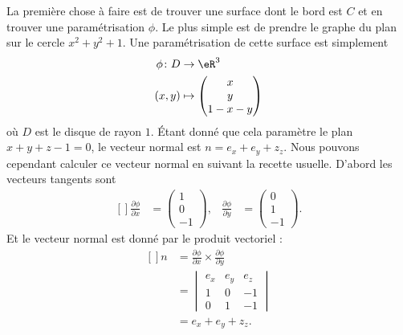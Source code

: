 \begin{example}
    La première chose à faire est de trouver une surface dont le bord est $C$ et en trouver une paramétrisation $\phi$. Le plus simple est de prendre le graphe du plan sur le cercle $x^2+y^2+1$. Une paramétrisation de cette surface est simplement
    \begin{equation}
        \begin{aligned}
            \phi\colon D&\to \eR^3 \\
            (x,y)&\mapsto \begin{pmatrix}
                x    \\ 
                y    \\ 
                1-x-y    
            \end{pmatrix}
        \end{aligned}
    \end{equation}
    où $D$ est le disque de rayon $1$. Étant donné que cela paramètre le plan $x+y+z-1=0$, le vecteur normal est $n=e_x+e_y+z_z$. Nous pouvons cependant calculer ce vecteur normal en suivant la recette usuelle. D'abord les vecteurs tangents sont
    \begin{equation}
        \begin{aligned}[]
            \frac{ \partial \phi }{ \partial x }&=\begin{pmatrix}
                1    \\ 
                0    \\ 
                -1    
            \end{pmatrix},
            &\frac{ \partial \phi }{ \partial y }&=\begin{pmatrix}
                0    \\ 
                1    \\ 
                -1    
            \end{pmatrix}.
        \end{aligned}
    \end{equation}
    Et le vecteur normal est donné par le produit vectoriel :
    \begin{equation}
        \begin{aligned}[]
            n&=\frac{ \partial \phi }{ \partial x }\times\frac{ \partial \phi }{ \partial y }\\
            &=\begin{vmatrix}
                e_x    &   e_y    &   e_z    \\
                1    &   0    &   -1    \\
                0    &   1    &   -1
            \end{vmatrix}\\
            &=e_x+e_y+z_z.
        \end{aligned}
    \end{equation}


\end{example}
